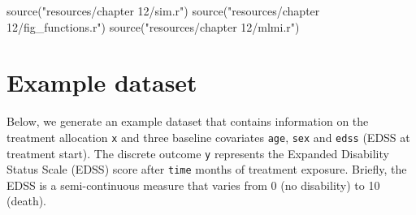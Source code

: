 \documentclass[
  letterpaper,
  DIV=11,
  numbers=noendperiod]{scrreprt}
\newenvironment{Shaded}{\begin{snugshade}}{\end{snugshade}}
\newcommand{\FunctionTok}[1]{\textcolor[rgb]{0.28,0.35,0.67}{#1}}
\newcommand{\NormalTok}[1]{\textcolor[rgb]{0.00,0.23,0.31}{#1}}
\newcommand{\StringTok}[1]{\textcolor[rgb]{0.13,0.47,0.30}{#1}}
\begin{document}
\begin{Shaded}
\begin{Highlighting}[]
\FunctionTok{source}\NormalTok{(}\StringTok{"resources/chapter 12/sim.r"}\NormalTok{)}
\FunctionTok{source}\NormalTok{(}\StringTok{"resources/chapter 12/fig\_functions.r"}\NormalTok{)}
\FunctionTok{source}\NormalTok{(}\StringTok{"resources/chapter 12/mlmi.r"}\NormalTok{)}
\end{Highlighting}
\end{Shaded}

\hypertarget{example-dataset}{%
\section{Example dataset}\label{example-dataset}}

Below, we generate an example dataset that contains information on the
treatment allocation \texttt{x} and three baseline covariates
\texttt{age}, \texttt{sex} and \texttt{edss} (EDSS at treatment start).
The discrete outcome \texttt{y} represents the Expanded Disability
Status Scale (EDSS) score after \texttt{time} months of treatment
exposure. Briefly, the EDSS is a semi-continuous measure that varies
from 0 (no disability) to 10 (death).
\end{document}
